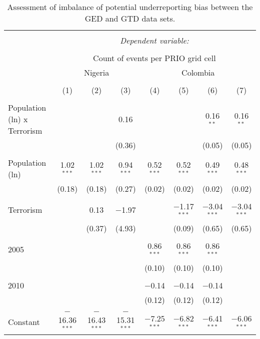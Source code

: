 
\begin{table}[!htbp] \centering 
  \caption{Assessment of imbalance of potential underreporting bias between the GED and GTD data sets.} 
  \label{tab:underreporting} 
\scriptsize 
\begin{tabular}{@{\extracolsep{-6pt}}lccccccc} 
\\[-1.8ex]\hline 
\hline \\[-1.8ex] 
 & \multicolumn{7}{c}{\textit{Dependent variable:}} \\ 
\cline{2-8} 
\\[-1.8ex] & \multicolumn{7}{c}{Count of events per PRIO grid cell} \\ 
 & \multicolumn{3}{c}{Nigeria} & \multicolumn{4}{c}{Colombia} \\ 
\\[-1.8ex] & (1) & (2) & (3) & (4) & (5) & (6) & (7)\\ 
\hline \\[-1.8ex] 
 Population (ln) x Terrorism &  &  & 0.16 &  &  & 0.16$^{**}$ & 0.16$^{**}$ \\ 
  &  &  & (0.36) &  &  & (0.05) & (0.05) \\ 
  & & & & & & & \\ 
 Population (ln) & 1.02$^{***}$ & 1.02$^{***}$ & 0.94$^{***}$ & 0.52$^{***}$ & 0.52$^{***}$ & 0.49$^{***}$ & 0.48$^{***}$ \\ 
  & (0.18) & (0.18) & (0.27) & (0.02) & (0.02) & (0.02) & (0.02) \\ 
  & & & & & & & \\ 
 Terrorism &  & 0.13 & $-$1.97 &  & $-$1.17$^{***}$ & $-$3.04$^{***}$ & $-$3.04$^{***}$ \\ 
  &  & (0.37) & (4.93) &  & (0.09) & (0.65) & (0.65) \\ 
  & & & & & & & \\ 
 2005 &  &  &  & 0.86$^{***}$ & 0.86$^{***}$ & 0.86$^{***}$ &  \\ 
  &  &  &  & (0.10) & (0.10) & (0.10) &  \\ 
  & & & & & & & \\ 
 2010 &  &  &  & $-$0.14 & $-$0.14 & $-$0.14 &  \\ 
  &  &  &  & (0.12) & (0.12) & (0.12) &  \\ 
  & & & & & & & \\ 
 Constant & $-$16.36$^{***}$ & $-$16.43$^{***}$ & $-$15.31$^{***}$ & $-$7.25$^{***}$ & $-$6.82$^{***}$ & $-$6.41$^{***}$ & $-$6.06$^{***}$ \\ 

\end{tabular}
\end{table}
